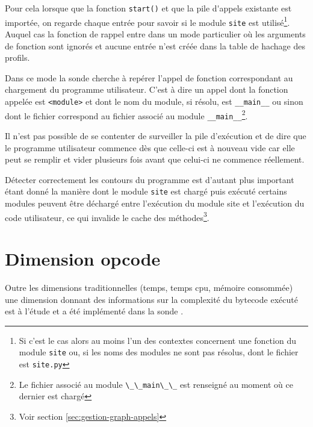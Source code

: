 Pour cela lorsque que la fonction \verb|start()| et que la \gls{pile d'appels} existante est importée, on regarde chaque entrée pour savoir si le module \verb|site| est utilisé\footnote{Si c'est le cas alors au moins l'un des contextes concernent une fonction du module \verb|site| ou, si les noms des modules ne sont pas résolus, dont le fichier est \verb|site.py|}. Auquel cas la fonction de rappel entre dans un mode particulier où les arguments de fonction sont ignorés et aucune entrée n'est créée dans la table de hachage des profils.

Dans ce mode la sonde cherche à repérer l'appel de fonction correspondant au chargement du programme utilisateur. C'est à dire un appel dont la fonction appelée est \verb|<module>| et dont le nom du module, si résolu, est \verb|__main__| ou sinon dont le fichier correspond au fichier associé au module \verb|__main__|\footnote{Le fichier associé au module \verb?\_\_main\_\_? est renseigné au moment où ce dernier est chargé}.

\begin{note}
Il n'est pas possible de se contenter de surveiller la pile d'exécution et de dire que le programme utilisateur commence dès que celle-ci est à nouveau vide car elle peut se remplir et vider plusieurs fois avant que celui-ci ne commence réellement.
\end{note}

\begin{note}
Détecter correctement les contours du programme est d'autant plus important étant donné la manière dont le module \verb|site| est chargé puis exécuté certains modules peuvent être déchargé entre l'exécution du module site et l'exécution du code utilisateur, ce qui invalide le cache des méthodes\footnote{Voir section \vref{sec:gestion-graph-appels}}.
\end{note}

  \section{Dimension opcode}
    
Outre les dimensions traditionnelles (temps, temps cpu, mémoire consommée) une dimension donnant des informations sur la complexité du \gls{bytecode} exécuté est à l'étude et a été implémenté dans la sonde \Python.

